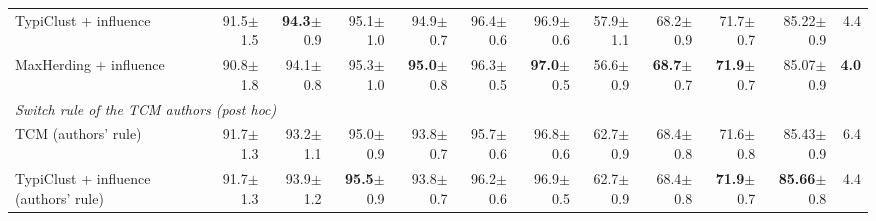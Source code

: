 \begin{table}[t]
\begin{adjustbox}{max width=\textwidth}
\begin{tabular}{lrrrrrrrrrrr}
\quad TypiClust + influence & 91.5{\scriptsize$\pm$1.5} & \textbf{94.3}{\scriptsize$\pm$0.9} & 95.1{\scriptsize$\pm$1.0} & 94.9{\scriptsize$\pm$0.7} & 96.4{\scriptsize$\pm$0.6} & 96.9{\scriptsize$\pm$0.6} & 57.9{\scriptsize$\pm$1.1} & 68.2{\scriptsize$\pm$0.9} & 71.7{\scriptsize$\pm$0.7} & 85.22{\scriptsize$\pm$0.9} & 4.4 \\
\quad MaxHerding + influence & 90.8{\scriptsize$\pm$1.8} & 94.1{\scriptsize$\pm$0.8} & 95.3{\scriptsize$\pm$1.0} & \textbf{95.0}{\scriptsize$\pm$0.8} & 96.3{\scriptsize$\pm$0.5} & \textbf{97.0}{\scriptsize$\pm$0.5} & 56.6{\scriptsize$\pm$0.9} & \textbf{68.7}{\scriptsize$\pm$0.7} & \textbf{71.9}{\scriptsize$\pm$0.7} & 85.07{\scriptsize$\pm$0.9} & \textbf{4.0} \\
\multicolumn{12}{l}{\textit{Switch rule of the TCM authors (post hoc)}} \\
\quad TCM (authors' rule)~\cite{doucet2024bridging} & 91.7{\scriptsize$\pm$1.3} & 93.2{\scriptsize$\pm$1.1} & 95.0{\scriptsize$\pm$0.9} & 93.8{\scriptsize$\pm$0.7} & 95.7{\scriptsize$\pm$0.6} & 96.8{\scriptsize$\pm$0.6} & 62.7{\scriptsize$\pm$0.9} & 68.4{\scriptsize$\pm$0.8} & 71.6{\scriptsize$\pm$0.8} & 85.43{\scriptsize$\pm$0.9} & 6.4 \\
\quad TypiClust + influence (authors' rule) & 91.7{\scriptsize$\pm$1.3} & 93.9{\scriptsize$\pm$1.2} & \textbf{95.5}{\scriptsize$\pm$0.9} & 93.8{\scriptsize$\pm$0.7} & 96.2{\scriptsize$\pm$0.6} & 96.9{\scriptsize$\pm$0.5} & 62.7{\scriptsize$\pm$0.9} & 68.4{\scriptsize$\pm$0.8} & \textbf{71.9}{\scriptsize$\pm$0.7} & \textbf{85.66}{\scriptsize$\pm$0.8} & 4.4 \\
\bottomrule
\end{tabular}
\end{adjustbox}
\end{table}
